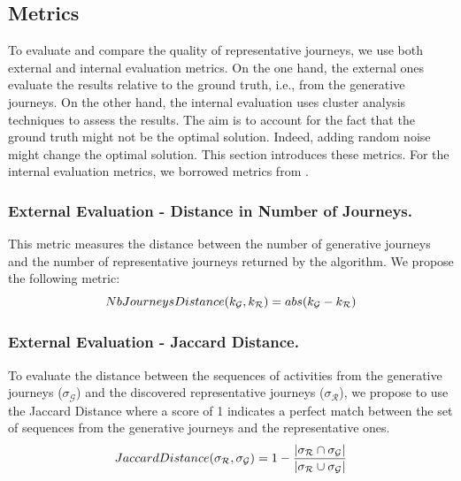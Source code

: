 \documentclass[runningheads]{llncs}
\begin{document}
{{\subsection{Metrics}
To evaluate and compare the quality of representative journeys, we use both external and internal evaluation metrics. On the one hand, the external ones evaluate the results relative to the ground truth, i.e., from the generative journeys. On the other hand, the internal evaluation uses cluster analysis techniques to assess the results. The aim is to account for the fact that the ground truth might not be the optimal solution. Indeed, adding random noise might change the optimal solution. This section introduces these metrics. For the internal evaluation metrics, we borrowed metrics from \cite{gabadinho2009extracting}.


\subsubsection{External Evaluation - Distance in Number of Journeys.} This metric measures the distance between the number of generative journeys and the number of representative journeys returned by the algorithm. We propose the following metric:
\begin{equation}
\footnotesize
    NbJourneysDistance({k_{\mathcal{G}}}, {k_{\mathcal{R}}}) = abs({k_{\mathcal{G}}} - {k_{\mathcal{R}}}) 
\end{equation}

\subsubsection{External Evaluation - Jaccard Distance.} To evaluate the distance between the sequences of activities from the generative journeys ($\sigma_{\mathcal{G}}$) and the discovered representative journeys ($\sigma_{\mathcal{R}}$), we propose to use the Jaccard Distance where a score of 1 indicates a perfect match between the set of sequences from the generative journeys and the representative ones. 
\begin{equation}
\footnotesize
    JaccardDistance(\mathbf{\sigma_{\mathcal{R}}}, \sigma_{\mathcal{G}}) = 1 - \frac{|\mathbf{\sigma_{\mathcal{R}} \cap \sigma_{\mathcal{G}}}|}{|\mathbf{\sigma_{\mathcal{R}} \cup \sigma_{\mathcal{G}}}|}
\end{equation}

}}
\end{document}
